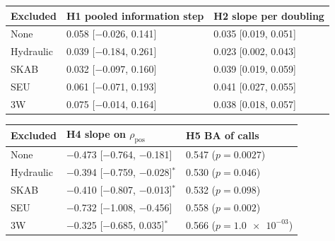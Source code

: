 \begin{tabular}{@{}l ll@{}}
\toprule
Excluded & H1 pooled information step & H2 slope per doubling \\
\midrule
None & 0.058 [$-$0.026, 0.141] & 0.035 [0.019, 0.051] \\
Hydraulic & 0.039 [$-$0.184, 0.261] & 0.023 [0.002, 0.043] \\
SKAB & 0.032 [$-$0.097, 0.160] & 0.039 [0.019, 0.059] \\
SEU & 0.061 [$-$0.071, 0.193] & 0.041 [0.027, 0.055] \\
3W & 0.075 [$-$0.014, 0.164] & 0.038 [0.018, 0.057] \\
\bottomrule
\end{tabular}
\par\medskip
\begin{tabular}{@{}l ll@{}}
\toprule
Excluded & H4 slope on $\rho_{\mathrm{pos}}$ & H5 BA of calls \\
\midrule
None & $-$0.473 [$-$0.764, $-$0.181] & 0.547 ($p=0.0027$) \\
Hydraulic & $-$0.394 [$-$0.759, $-$0.028]$^{\ast}$ & 0.530 ($p=0.046$) \\
SKAB & $-$0.410 [$-$0.807, $-$0.013]$^{\ast}$ & 0.532 ($p=0.098$) \\
SEU & $-$0.732 [$-$1.008, $-$0.456] & 0.558 ($p=0.002$) \\
3W & $-$0.325 [$-$0.685, 0.035]$^{\ast}$ & 0.566 ($p=\num{1.0e-03}$) \\
\bottomrule
\end{tabular}
